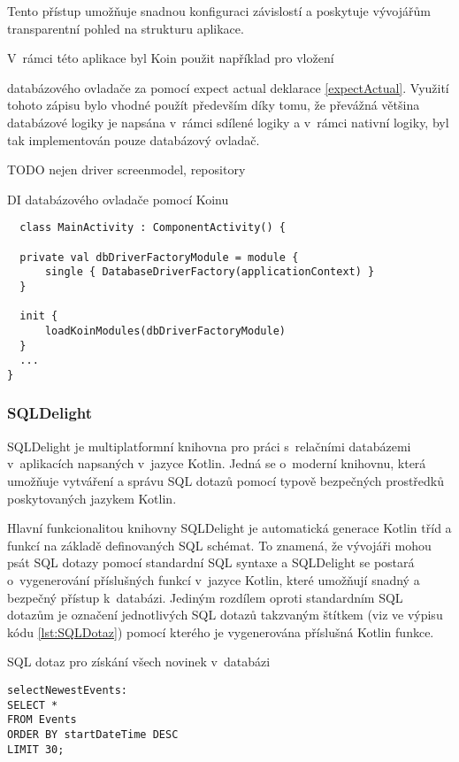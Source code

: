 Tento přístup umožňuje snadnou konfiguraci závislostí a poskytuje
vývojářům transparentní pohled na strukturu aplikace.

\bigskip

V~rámci této aplikace byl Koin použit například pro vložení 


databázového ovladače za pomocí expect actual deklarace \ref{expectActual}.
Využití tohoto zápisu bylo vhodné použít především díky tomu, že převážná většina databázové logiky je napsána v~rámci sdílené 
logiky a v~rámci nativní logiky, byl tak implementován pouze databázový ovladač.

TODO nejen driver screenmodel, repository
\begin{listing}[H]
\caption{DI databázového ovladače pomocí Koinu}\label{lst:KoinInit}
\begin{verbatim}
  class MainActivity : ComponentActivity() {

  private val dbDriverFactoryModule = module {
      single { DatabaseDriverFactory(applicationContext) }
  }

  init {
      loadKoinModules(dbDriverFactoryModule)
  }
  ...
}
\end{verbatim}
\end{listing}

\subsubsection*{SQLDelight}
SQLDelight je multiplatformní knihovna pro práci s~relačními databázemi v~aplikacích napsaných v~jazyce Kotlin. Jedná se o~moderní knihovnu, 
která umožňuje vytváření a správu SQL dotazů pomocí typově bezpečných prostředků poskytovaných jazykem Kotlin.

Hlavní funkcionalitou knihovny SQLDelight je automatická generace Kotlin tříd a funkcí na základě definovaných SQL schémat. To znamená, že vývojáři
 mohou psát SQL dotazy pomocí standardní SQL syntaxe a SQLDelight se postará o~vygenerování příslušných funkcí v~jazyce Kotlin, které umožňují 
 snadný a bezpečný přístup k~databázi. Jediným rozdílem oproti standardním SQL dotazům je označení jednotlivých SQL dotazů takzvaným 
 štítkem (viz  ve výpisu kódu \ref{lst:SQLDotaz}) pomocí kterého je vygenerována příslušná Kotlin funkce. 

\begin{listing}[H]
\caption{SQL dotaz pro získání všech novinek v~databázi}\label{lst:SQLDotaz}
\begin{verbatim}
selectNewestEvents:
SELECT *
FROM Events
ORDER BY startDateTime DESC
LIMIT 30;
\end{verbatim}
\end{listing}


